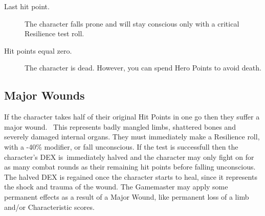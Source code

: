 \begin{description}
	\item[Last hit point.] The character falls prone and will stay conscious only with a critical Resilience test roll.
	\item[Hit points equal zero.] The character is dead. However, you can spend Hero Points to avoid death.
\end{description}


\subsection{Major Wounds}
If the character takes half of their original Hit Points in one go then they suffer a major wound.  This represents badly mangled limbs, shattered bones and severely damaged internal organs.
They must immediately make a Resilience roll, with a -40\% modifier, or fall unconscious. If the test is successfull then the character’s DEX is immediately halved and the character may only fight on for as many combat rounds as their remaining hit points before falling unconscious.
The halved DEX is regained once the character starts to heal, since it represents the shock and trauma of the wound.
The Gamemaster may apply some permanent effects as a result of a Major Wound, like permanent loss of a limb and/or Characteristic scores.

